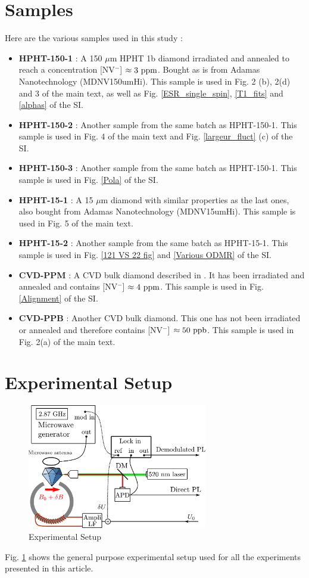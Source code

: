 \documentclass[preprintnumbers,amsmath,amssymb,onecolumn,12pt]{revtex4-2}\usepackage{graphicx}%
\begin{document}
\section{Samples}
Here are the various samples used in this study :
\begin{itemize}
\item \textbf{HPHT-150-1} : A 150 $\mu$m HPHT 1b diamond irradiated and annealed to reach a concentration [NV$^-$] $\approx 3\ \rm ppm$. Bought as is from Adamas Nanotechnology (MDNV150umHi). This sample is used in Fig. 2 (b), 2(d) and 3 of the main text, as well as Fig. \ref{ESR_single_spin}, \ref{T1_fits} and \ref{alphas} of the SI.
\item \textbf{HPHT-150-2} : Another sample from the same batch as HPHT-150-1. This sample is used in Fig. 4 of the main text and Fig. \ref{largeur_fluct} (c) of the SI.
\item \textbf{HPHT-150-3} : Another sample from the same batch as HPHT-150-1. This sample is used in Fig. \ref{Pola} of the SI.
\item \textbf{HPHT-15-1}  : A 15 $\mu$m diamond with similar properties as the last ones, also bought from Adamas Nanotechnology (MDNV15umHi). This sample is used in Fig. 5 of the main text.
\item \textbf{HPHT-15-2}  : Another sample from the same batch as HPHT-15-1. This sample is used in Fig. \ref{121 VS 22 fig} and \ref{Various ODMR} of the SI.
\item \textbf{CVD-PPM} : A CVD bulk diamond described in \citep{TALLAIRE2020421}. It has been irradiated and annealed and contains [NV$^-$] $\approx 4\ \rm ppm$. This sample is used in Fig. \ref{Alignment} of the SI.
\item \textbf{CVD-PPB} : Another CVD bulk diamond. This one has not been irradiated or annealed and therefore contains [NV$^-$] $\approx 50\ \rm ppb$. This sample is used in Fig. 2(a) of the main text.


\end{itemize}

\section{Experimental Setup}
\begin{figure}
\includegraphics[width=0.7\textwidth]{Figures_SI/shema_exp}
\caption{Experimental Setup}
\label{setup}
\end{figure}
Fig. \ref{setup} shows the general purpose experimental setup used for all the experiments presented in this article.
\end{document}
